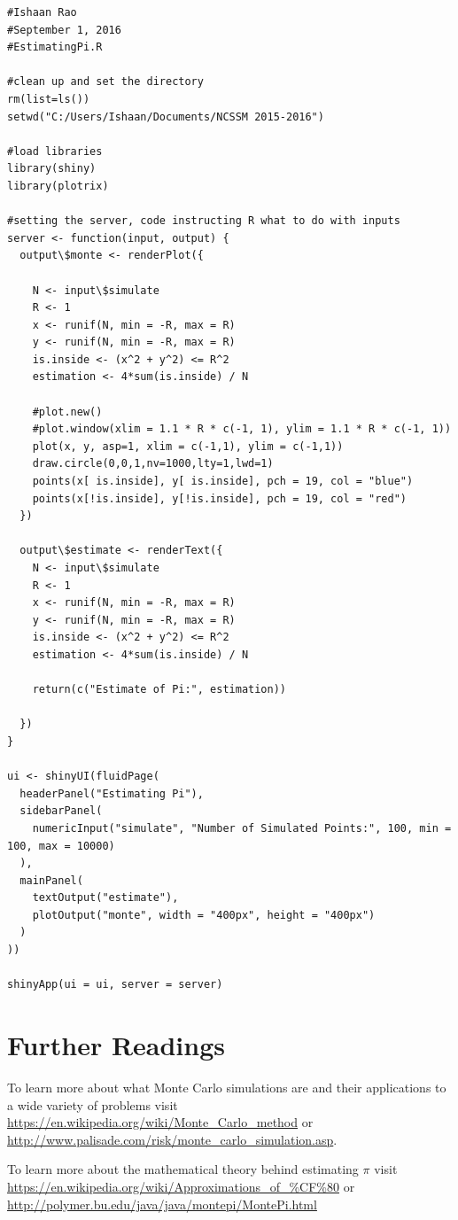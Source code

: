 \begin{lstlisting}
#Ishaan Rao
#September 1, 2016
#EstimatingPi.R

#clean up and set the directory
rm(list=ls())
setwd("C:/Users/Ishaan/Documents/NCSSM 2015-2016")

#load libraries
library(shiny)
library(plotrix)

#setting the server, code instructing R what to do with inputs
server <- function(input, output) {
  output\$monte <- renderPlot({
    
    N <- input\$simulate
    R <- 1
    x <- runif(N, min = -R, max = R)
    y <- runif(N, min = -R, max = R)
    is.inside <- (x^2 + y^2) <= R^2
    estimation <- 4*sum(is.inside) / N
    
    #plot.new()
    #plot.window(xlim = 1.1 * R * c(-1, 1), ylim = 1.1 * R * c(-1, 1))
    plot(x, y, asp=1, xlim = c(-1,1), ylim = c(-1,1))
    draw.circle(0,0,1,nv=1000,lty=1,lwd=1)
    points(x[ is.inside], y[ is.inside], pch = 19, col = "blue")
    points(x[!is.inside], y[!is.inside], pch = 19, col = "red")
  })
  
  output\$estimate <- renderText({
    N <- input\$simulate
    R <- 1
    x <- runif(N, min = -R, max = R)
    y <- runif(N, min = -R, max = R)
    is.inside <- (x^2 + y^2) <= R^2
    estimation <- 4*sum(is.inside) / N
    
    return(c("Estimate of Pi:", estimation))
    
  })
}

ui <- shinyUI(fluidPage(
  headerPanel("Estimating Pi"),
  sidebarPanel(
    numericInput("simulate", "Number of Simulated Points:", 100, min = 100, max = 10000)
  ),
  mainPanel(
    textOutput("estimate"),
    plotOutput("monte", width = "400px", height = "400px")
  )
))

shinyApp(ui = ui, server = server)

\end{lstlisting}

\section{Further Readings}

To learn more about what Monte Carlo simulations are and their applications to a wide variety of problems visit \url{https://en.wikipedia.org/wiki/Monte\_Carlo\_method} or 
\url{http://www.palisade.com/risk/monte\_carlo\_simulation.asp}.

\noindent To learn more about the mathematical theory behind estimating $\pi$ visit \url{https://en.wikipedia.org/wiki/Approximations_of_\%CF\%80} or \url{http://polymer.bu.edu/java/java/montepi/MontePi.html}
